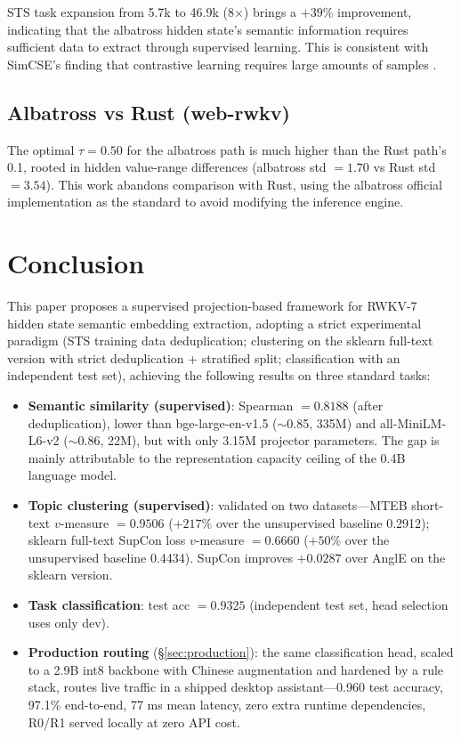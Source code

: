 \documentclass[11pt]{article}
\begin{document}
STS task expansion from 5.7k to 46.9k (8$\times$) brings a $+39\%$
improvement, indicating that the albatross hidden state's semantic
information requires sufficient data to extract through supervised
learning. This is consistent with SimCSE's finding that contrastive
learning requires large amounts of samples \cite{simcse}.

\subsection{Albatross vs Rust (web-rwkv)}

The optimal $\tau=0.50$ for the albatross path is much higher than the Rust
path's 0.1, rooted in hidden value-range differences (albatross std $=1.70$
vs Rust std $=3.54$). This work abandons comparison with Rust, using the
albatross official implementation as the standard to avoid modifying the
inference engine.

\section{Conclusion}

This paper proposes a supervised projection-based framework for RWKV-7
hidden state semantic embedding extraction, adopting a strict experimental
paradigm (STS training data deduplication; clustering on the sklearn
full-text version with strict deduplication + stratified split;
classification with an independent test set), achieving the following
results on three standard tasks:

\begin{itemize}
  \item \textbf{Semantic similarity (supervised)}: Spearman $=0.8188$ (after
  deduplication), lower than bge-large-en-v1.5 ($\sim$0.85, 335M) and
  all-MiniLM-L6-v2 ($\sim$0.86, 22M), but with only 3.15M projector
  parameters. The gap is mainly attributable to the representation capacity
  ceiling of the 0.4B language model.
  \item \textbf{Topic clustering (supervised)}: validated on two
  datasets---MTEB short-text $v$-measure $=0.9506$ ($+217\%$ over the
  unsupervised baseline 0.2912); sklearn full-text SupCon loss
  $v$-measure $=0.6660$ ($+50\%$ over the unsupervised baseline 0.4434).
  SupCon improves $+0.0287$ over AnglE on the sklearn version.
  \item \textbf{Task classification}: test acc $=0.9325$ (independent test
  set, head selection uses only dev).
  \item \textbf{Production routing}
  (\S\ref{sec:production}): the same classification head, scaled to a 2.9B
  int8 backbone with Chinese augmentation and hardened by a rule stack,
  routes live traffic in a shipped desktop assistant---0.960 test accuracy,
  97.1\% end-to-end, 77 ms mean latency, zero extra runtime dependencies,
  R0/R1 served locally at zero API cost.
\end{itemize}
\end{document}
